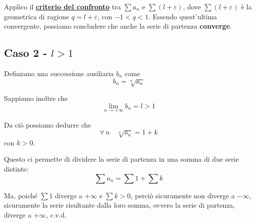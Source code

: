 \documentclass[../dimostrazioni]{subfiles}
\begin{document}
                Applico il \textbf{\hyperref[serieconfronto]{criterio del confronto}} tra \(\sum a_n\) e \(\sum(l + \varepsilon)\),
                dove \(\sum(l + \varepsilon)\) è la geometrica di ragione \(q = l + \varepsilon\), con \(-1 < q < 1\).
                Essendo quest'ultima convergente, possiamo concludere che anche la serie di partenza \textbf{converge}.

            \subsection*{Caso 2 - \(l > 1\)}

                Definiamo una successione ausiliaria \(b_n\) come
                \[ b_n = \sqrt[n]{a_n} \]

                Sappiamo inoltre che
                \[ \lim_{n \to +\infty}b_n = l > 1 \]

                Da ciò possiamo dedurre che
                \[\forall \, n \quad \sqrt[n]{a_n} = 1 + k\]
                con \(k > 0\).

                Questo ci permette di dividere la serie di partenza in una somma di due serie distinte:
                \[\sum a_n = \sum 1 + \sum k\]

                Ma, poiché \(\sum 1\) diverge a \(+ \infty\) e \(\sum k > 0\), perciò sicuramente non diverge a \(- \infty\),
                sicuramente la serie risultante dalla loro somma, ovvero la serie di partenza, diverge a \(+ \infty\), c.v.d.
\end{document}
